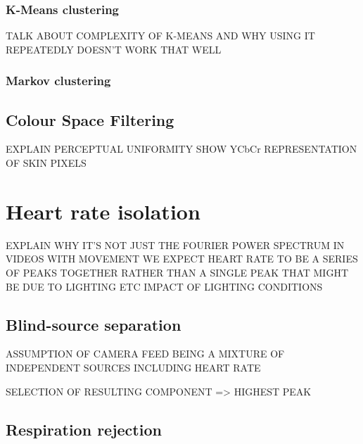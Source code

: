 \subsubsection{K-Means clustering}
TALK ABOUT COMPLEXITY OF K-MEANS AND WHY USING IT REPEATEDLY DOESN'T WORK THAT WELL
\subsubsection{Markov clustering}

\subsection{Colour Space Filtering}
EXPLAIN PERCEPTUAL UNIFORMITY 
SHOW YCbCr REPRESENTATION OF SKIN PIXELS


\section{Heart rate isolation}
EXPLAIN WHY IT'S NOT JUST THE FOURIER POWER SPECTRUM
IN VIDEOS WITH MOVEMENT WE EXPECT HEART RATE TO BE A SERIES OF PEAKS TOGETHER RATHER THAN A SINGLE PEAK
THAT MIGHT BE DUE TO LIGHTING ETC
IMPACT OF LIGHTING CONDITIONS

\subsection{Blind-source separation}
ASSUMPTION OF CAMERA FEED BEING A MIXTURE OF INDEPENDENT SOURCES INCLUDING HEART RATE

SELECTION OF RESULTING COMPONENT => HIGHEST PEAK



\subsection{Respiration rejection}
